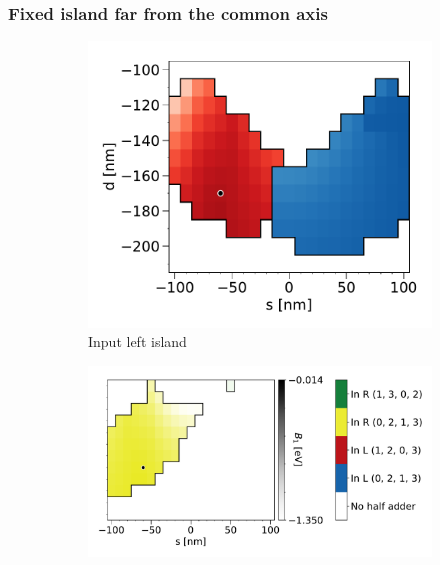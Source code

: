 \documentclass[11pt,a4paper,english,twoside]{article}
\begin{document}
\subsubsection{Fixed island far from the common axis}
\begin{figure}
    \centering
    \begin{subfigure}[t]{0.396\textwidth}
        \includegraphics[width=\textwidth]{Figures/half_adder/sweep/000006_d-s/table(d100-210_10,s-100-100_10)_balanced1_L.pdf}
        \caption{Input left island}
    \label{fig:HalfAdder_000006_sweep_d-s_balanced1-L}
    \end{subfigure}
    \begin{subfigure}[t]{0.594\textwidth}
        \includegraphics[width=\textwidth]{Figures/half_adder/sweep/000006_d-s/table(d100-210_10,s-100-100_10)_balanced1_R.pdf}

\end{subfigure}
\end{figure}
\end{document}
